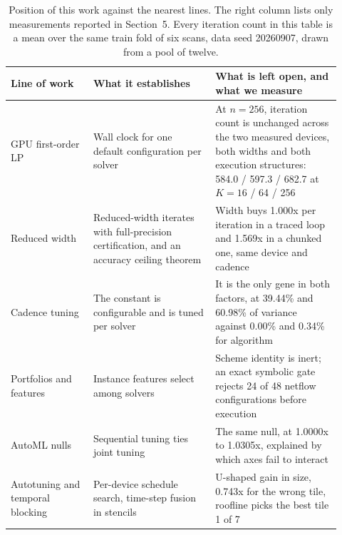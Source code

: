 \begin{table}[t]
\centering
\caption{Position of this work against the nearest lines. The right column
lists only measurements reported in Section~5. Every iteration count in this
table is a mean over the same train fold of six scans, data seed 20260907,
drawn from a pool of twelve.}
\label{tab:related}
\small
\begin{tabular}{@{}p{0.23\linewidth}p{0.34\linewidth}p{0.35\linewidth}@{}}
\toprule
Line of work & What it establishes & What is left open, and what we measure \\
\midrule
GPU first-order LP \citep{Applegate2021Practical,Lu2024HPRLP,cuOpt2026}
& Wall clock for one default configuration per solver
& At $n=256$, iteration count is unchanged across the two measured devices, both widths and both execution structures: 584.0 / 597.3 / 682.7 at $K=16$ / 64 / 256 \\
Reduced width \citep{CarsonHigham2018,CuClarabel2024,cuOSQP2020}
& Reduced-width iterates with full-precision certification, and an accuracy ceiling theorem
& Width buys 1.000x per iteration in a traced loop and 1.569x in a chunked one, same device and cadence \\
Cadence tuning \citep{ORToolsPDLP2026}
& The constant is configurable and is tuned per solver
& It is the only gene in both factors, at 39.44\% and 60.98\% of variance against 0.00\% and 0.34\% for algorithm \\
Portfolios and features \citep{Xu2008SATzilla,BischlASlib2016}
& Instance features select among solvers
& Scheme identity is inert; an exact symbolic gate rejects 24 of 48 netflow configurations before execution \\
AutoML nulls \citep{PushakHoos2022}
& Sequential tuning ties joint tuning
& The same null, at 1.0000x to 1.0305x, explained by which axes fail to interact \\
Autotuning and temporal blocking \citep{Zheng2020Ansor,Su2012clSpMV}
& Per-device schedule search, time-step fusion in stencils
& U-shaped gain in size, 0.743x for the wrong tile, roofline picks the best tile 1 of 7 \\
\bottomrule
\end{tabular}
\end{table}

